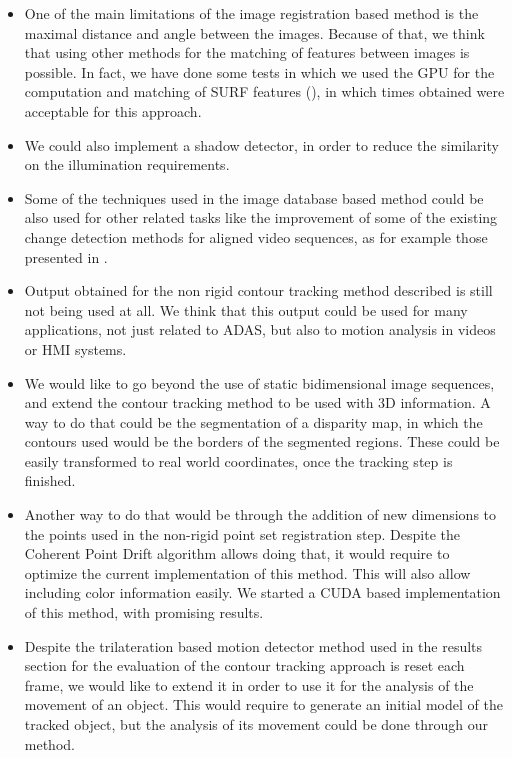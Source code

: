 \begin{itemize}
 \item One of the main limitations of the image registration based method is the maximal distance and angle between the images. Because of that, we think that using other methods for the matching of features between images is possible. In fact, we have done some tests in which we used the \acs{GPU} for the computation and matching of \acs{SURF} features (\cite{bay2008speeded}), in which times obtained were acceptable for this approach.
 \item We could also implement a shadow detector, in order to reduce the similarity on the illumination requirements.
 \item Some of the techniques used in the image database based method could be also used for other related tasks like the improvement of some of the existing change detection methods for aligned video sequences, as for example those presented in \cite{diego2011video, evangelidis2011slice, evangelidis2011efficient}.
 \item Output obtained for the non rigid contour tracking method described is still not being used at all. We think that this output could be used for many applications, not just related to \ac{ADAS}, but also to motion analysis in videos or \ac{HMI} systems.
 \item We would like to go beyond the use of static bidimensional image sequences, and extend the contour tracking method to be used with 3D information. A way to do that could be the segmentation of a disparity map, in which the contours used would be the borders of the segmented regions. These could be easily transformed to real world coordinates, once the tracking step is finished.
 \item Another way to do that would be through the addition of new dimensions to the points used in the non-rigid point set registration step. Despite the Coherent Point Drift algorithm allows doing that, it would require to optimize the current implementation of this method. This will also allow including color information easily. We started a \acs{CUDA} based implementation of this method, with promising results.
 \item Despite the trilateration based motion detector method used in the results section for the evaluation of the contour tracking approach is reset each frame, we would like to extend it in order to use it for the analysis of the movement of an object. This would require to generate an initial model of the tracked object, but the analysis of its movement could be done through our method.

\end{itemize}
